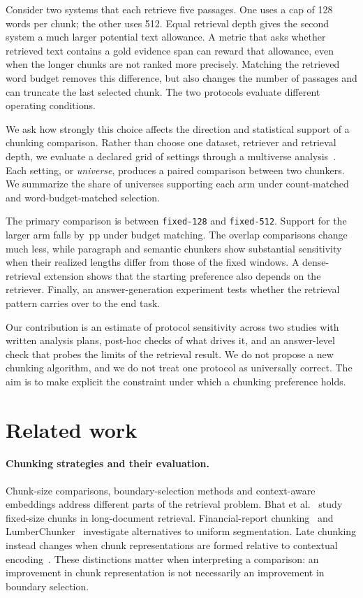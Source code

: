 \documentclass[11pt]{article}
\newcommand{\pp}{\ensuremath{\,\mathrm{pp}}}
\newcommand{\chunk}[1]{\texttt{#1}}
\begin{document}
Consider two systems that each retrieve five passages. One uses a cap of 128 words per chunk; the other uses 512. Equal retrieval depth gives the second system a much larger potential text allowance. A metric that asks whether retrieved text contains a gold evidence span can reward that allowance, even when the longer chunks are not ranked more precisely. Matching the retrieved word budget removes this difference, but also changes the number of passages and can truncate the last selected chunk. The two protocols evaluate different operating conditions.

We ask how strongly this choice affects the direction and statistical support of a chunking comparison. Rather than choose one dataset, retriever and retrieval depth, we evaluate a declared grid of settings through a multiverse analysis~\cite{steegen2016multiverse}. Each setting, or \emph{universe}, produces a paired comparison between two chunkers. We summarize the share of universes supporting each arm under count-matched and word-budget-matched selection.

The primary comparison is between \chunk{fixed-128} and \chunk{fixed-512}. Support for the larger arm falls by \HOneEst\pp{} under budget matching. The overlap comparisons change much less, while paragraph and semantic chunkers show substantial sensitivity when their realized lengths differ from those of the fixed windows. A dense-retrieval extension shows that the starting preference also depends on the retriever. Finally, an answer-generation experiment tests whether the retrieval pattern carries over to the end task.

Our contribution is an estimate of protocol sensitivity across two studies with written analysis plans, post-hoc checks of what drives it, and an answer-level check that probes the limits of the retrieval result. We do not propose a new chunking algorithm, and we do not treat one protocol as universally correct. The aim is to make explicit the constraint under which a chunking preference holds.

\section{Related work}\label{sec:related}
\paragraph{Chunking strategies and their evaluation.}
Chunk-size comparisons, boundary-selection methods and context-aware embeddings address different parts of the retrieval problem. Bhat et al.~\cite{bhat2025chunksize} study fixed-size chunks in long-document retrieval. Financial-report chunking~\cite{jimenoyepes2024financial} and LumberChunker~\cite{duarte2024lumberchunker} investigate alternatives to uniform segmentation. Late chunking instead changes when chunk representations are formed relative to contextual encoding~\cite{gunther2024latechunking}. These distinctions matter when interpreting a comparison: an improvement in chunk representation is not necessarily an improvement in boundary selection.
\end{document}
